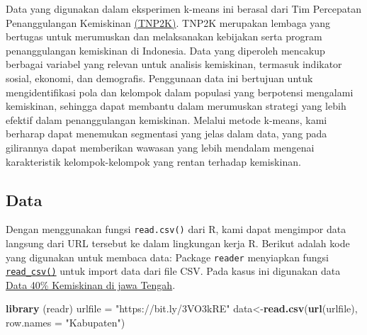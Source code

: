 \documentclass[
  oneside]{book}
\newenvironment{Shaded}{\begin{snugshade}}{\end{snugshade}}
\newcommand{\AttributeTok}[1]{\textcolor[rgb]{0.13,0.29,0.53}{#1}}
\newcommand{\FunctionTok}[1]{\textcolor[rgb]{0.13,0.29,0.53}{\textbf{#1}}}
\newcommand{\NormalTok}[1]{#1}
\newcommand{\OtherTok}[1]{\textcolor[rgb]{0.56,0.35,0.01}{#1}}
\newcommand{\StringTok}[1]{\textcolor[rgb]{0.31,0.60,0.02}{#1}}
\begin{document}
Data yang digunakan dalam eksperimen k-means ini berasal dari Tim Percepatan Penanggulangan Kemiskinan \href{https://www.tnp2k.go.id/}{(TNP2K)}. TNP2K merupakan lembaga yang bertugas untuk merumuskan dan melaksanakan kebijakan serta program penanggulangan kemiskinan di Indonesia. Data yang diperoleh mencakup berbagai variabel yang relevan untuk analisis kemiskinan, termasuk indikator sosial, ekonomi, dan demografis. Penggunaan data ini bertujuan untuk mengidentifikasi pola dan kelompok dalam populasi yang berpotensi mengalami kemiskinan, sehingga dapat membantu dalam merumuskan strategi yang lebih efektif dalam penanggulangan kemiskinan. Melalui metode k-means, kami berharap dapat menemukan segmentasi yang jelas dalam data, yang pada gilirannya dapat memberikan wawasan yang lebih mendalam mengenai karakteristik kelompok-kelompok yang rentan terhadap kemiskinan.

\subsection*{Data}\label{data}

Dengan menggunakan fungsi \texttt{read.csv()} dari R, kami dapat mengimpor data langsung dari URL tersebut ke dalam lingkungan kerja R. Berikut adalah kode yang digunakan untuk membaca data:
Package \texttt{reader} menyiapkan fungsi \href{https://readr.tidyverse.org/reference/read_delim.html}{\texttt{read\_csv()}} untuk import data dari file CSV. Pada kasus ini digunakan data \href{https://github.com/dedenistiawan/Dataset/blob/main/BDT.csv}{Data 40\% Kemiskinan di jawa Tengah}.

\begin{Shaded}
\begin{Highlighting}[]
\FunctionTok{library}\NormalTok{ (readr)}
\NormalTok{urlfile }\OtherTok{=} \StringTok{"https://bit.ly/3VO3kRE"}
\NormalTok{data}\OtherTok{\textless{}{-}}\FunctionTok{read.csv}\NormalTok{(}\FunctionTok{url}\NormalTok{(urlfile), }\AttributeTok{row.names =} \StringTok{"Kabupaten"}\NormalTok{)}
\end{Highlighting}
\end{Shaded}
\end{document}
